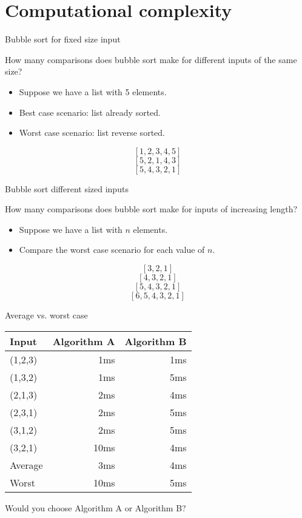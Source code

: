 


\section{Computational complexity}


\begin{frame}{Bubble sort for fixed size input}
  \begin{alertblock}{How many comparisons does bubble sort make for different inputs of the same size?}
    \begin{itemize}
      \item Suppose we have a list with 5 elements.
      \item Best case scenario: list already sorted.
      \item Worst case scenario: list reverse sorted.
    \end{itemize}
    \[ [1,2,3,4,5] \]
    \[ [5,2,1,4,3] \]
    \[ [5,4,3,2,1] \]
  \end{alertblock}
\end{frame}


\begin{frame}{Bubble sort different sized inputs}
  \begin{alertblock}{How many comparisons does bubble sort make for inputs of increasing length?}
    \begin{itemize}
      \item Suppose we have a list with $n$ elements.
      \item Compare the worst case scenario for each value of $n$.
    \end{itemize}
    \[ [3,2,1] \]
    \[ [4,3,2,1] \]
    \[ [5,4,3,2,1] \]
    \[ [6,5,4,3,2,1] \]
  \end{alertblock}
\end{frame}


\begin{frame}{Average vs. worst case}
  \begin{table}
    \begin{tabular}{p{2cm}rr}
      Input & Algorithm A & \hspace{1cm} Algorithm B \\
      \hline
      (1,2,3) &  1ms &  1ms \\
      (1,3,2) &  1ms &  5ms \\
      (2,1,3) &  2ms &  4ms \\
      (2,3,1) &  2ms &  5ms \\
      (3,1,2) &  2ms &  5ms \\
      (3,2,1) & 10ms &  4ms \\
      \hline
      Average &  3ms &  4ms \\
      Worst   & 10ms &  5ms
    \end{tabular}
  \end{table}
  \begin{center}
    Would you choose Algorithm A or Algorithm B?
  \end{center}
\end{frame}


